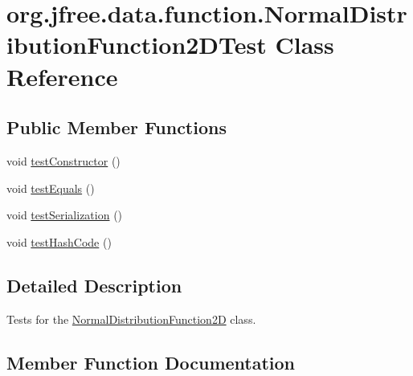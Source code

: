 \hypertarget{classorg_1_1jfree_1_1data_1_1function_1_1_normal_distribution_function2_d_test}{}\section{org.\+jfree.\+data.\+function.\+Normal\+Distribution\+Function2\+D\+Test Class Reference}
\label{classorg_1_1jfree_1_1data_1_1function_1_1_normal_distribution_function2_d_test}
\subsection*{Public Member Functions}
\begin{DoxyCompactItemize}
\item 
void \mbox{\hyperlink{classorg_1_1jfree_1_1data_1_1function_1_1_normal_distribution_function2_d_test_a291085ecb345367613e5a32407ad3e80}{test\+Constructor}} ()
\item 
void \mbox{\hyperlink{classorg_1_1jfree_1_1data_1_1function_1_1_normal_distribution_function2_d_test_a04cd1935a8cf295df98dd90ce5402ea0}{test\+Equals}} ()
\item 
void \mbox{\hyperlink{classorg_1_1jfree_1_1data_1_1function_1_1_normal_distribution_function2_d_test_a49e93081a07d18475d0ddcc204c02c10}{test\+Serialization}} ()
\item 
void \mbox{\hyperlink{classorg_1_1jfree_1_1data_1_1function_1_1_normal_distribution_function2_d_test_ad55f799c1ffacceb1efa601392314616}{test\+Hash\+Code}} ()
\end{DoxyCompactItemize}


\subsection{Detailed Description}
Tests for the \mbox{\hyperlink{classorg_1_1jfree_1_1data_1_1function_1_1_normal_distribution_function2_d}{Normal\+Distribution\+Function2D}} class. 

\subsection{Member Function Documentation}
\mbox{\label{classorg_1_1jfree_1_1data_1_1function_1_1_normal_distribution_function2_d_test_a291085ecb345367613e5a32407ad3e80}} 
